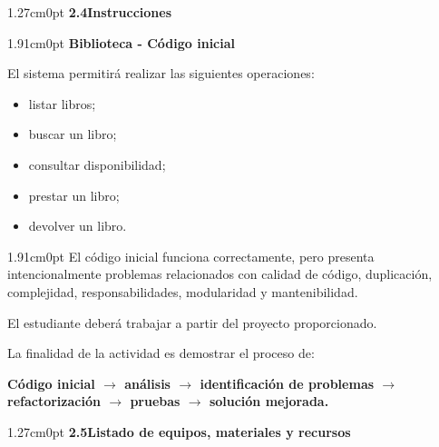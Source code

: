 \documentclass[12pt,letterpaper]{article}
\newcommand{\flechar}{$\rightarrow$}
\begin{document}
\vspace{6pt}

\begin{adjustwidth}{1.27cm}{0pt}
\textbf{2.4\enspace Instrucciones}
\end{adjustwidth}

\vspace{2pt}

\begin{adjustwidth}{1.91cm}{0pt}
\textbf{Biblioteca - C\'odigo inicial}

\vspace{2pt}
El sistema permitir\'a realizar las siguientes operaciones:
\end{adjustwidth}

\begin{itemize}[leftmargin=1.27cm, label=\textbullet, topsep=1pt, itemsep=0pt, parsep=0pt]
  \item listar libros;
  \item buscar un libro;
  \item consultar disponibilidad;
  \item prestar un libro;
  \item devolver un libro.
\end{itemize}

\begin{adjustwidth}{1.91cm}{0pt}
El c\'odigo inicial funciona correctamente, pero presenta intencionalmente problemas relacionados con calidad de c\'odigo, duplicaci\'on, complejidad, responsabilidades, modularidad y mantenibilidad.

\vspace{2pt}
El estudiante deber\'a trabajar a partir del proyecto proporcionado.

\vspace{2pt}
La finalidad de la actividad es demostrar el proceso de:

\vspace{2pt}
\textbf{C\'odigo inicial \flechar{} an\'alisis \flechar{} identificaci\'on de problemas \flechar{} refactorizaci\'on \flechar{} pruebas \flechar{} soluci\'on mejorada.}
\end{adjustwidth}

\vspace{6pt}

\begin{adjustwidth}{1.27cm}{0pt}
\textbf{2.5\enspace Listado de equipos, materiales y recursos}
\end{adjustwidth}
\end{document}
